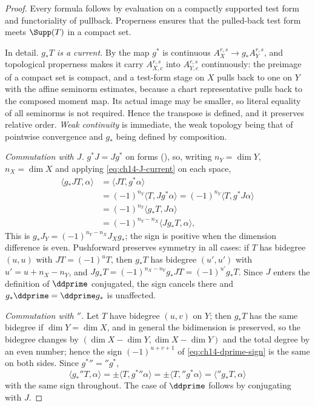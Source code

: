 \begin{proof}
Every formula follows by evaluation on a compactly supported test form and
functoriality of pullback.  Properness ensures that the pulled-back test form
meets $\Supp(T)$ in a compact set.

In detail.  \emph{$g_*T$ is a current.}  By
 the map $g^*$ is continuous
$A_X^{r,s}\to g_*A_Y^{r,s}$, and topological properness makes it carry
$A_{X,c}^{r,s}$ into $A_{Y,c}^{r,s}$ continuously: the preimage of a compact
set is compact, and a test-form stage on $X$ pulls back to one on $Y$ with the
affine seminorm estimates, because a chart representative pulls back
to the composed moment map. Its actual image may be smaller, so literal
equality of all seminorms is not required.  Hence the transpose is defined,
and it preserves relative order.  \emph{Weak continuity} is immediate, the
weak topology being that of pointwise convergence and $g_*$ being defined by
composition.

\emph{Commutation with $J$.}  $g^*J=Jg^*$ on forms
(), so, writing $n_Y=\dim Y$, $n_X=\dim X$ and
applying \eqref{eq:ch14-J-current} on each space,
\[
 \begin{aligned}
 \langle g_*JT,\alpha\rangle
 &=\langle JT,g^*\alpha\rangle\\
 &=(-1)^{n_Y}\langle T,Jg^*\alpha\rangle
  =(-1)^{n_Y}\langle T,g^*J\alpha\rangle\\
 &=(-1)^{n_Y}\langle g_*T,J\alpha\rangle\\
 &=(-1)^{n_Y-n_X}\langle Jg_*T,\alpha\rangle ,
 \end{aligned}
\]
This is $g_*J_Y=(-1)^{n_Y-n_X}J_Xg_*$; the sign is positive when
the dimension difference is even.  Pushforward preserves symmetry in all cases: if $T$ has
bidegree $(u,u)$ with $JT=(-1)^uT$, then $g_*T$ has bidegree $(u',u')$ with
$u'=u+n_X-n_Y$, and
$Jg_*T=(-1)^{n_X-n_Y}g_*JT=(-1)^{u'}g_*T$.  Since $J$ enters the definition
of $\ddprime$ conjugated, the sign cancels there and
$g_*\ddprime=\ddprime g_*$ is unaffected.

\emph{Commutation with $\dprime$.}  Let $T$ have bidegree $(u,v)$ on $Y$;
then $g_*T$ has the same bidegree if $\dim Y=\dim X$, and in general the
bidimension is preserved, so the bidegree changes by
$(\dim X-\dim Y,\dim X-\dim Y)$ and the total degree by an even number;
hence the sign $(-1)^{u+v+1}$ of \eqref{eq:ch14-dprime-sign} is the same on
both sides.  Since $g^*\dprime=\dprime g^*$,
\[
 \langle g_*\dprime T,\alpha\rangle
 =\pm\langle T,g^*\dprime\alpha\rangle
 =\pm\langle T,\dprime g^*\alpha\rangle
 =\langle \dprime g_*T,\alpha\rangle
\]
with the same sign throughout.  The case of $\ddprime$ follows by conjugating
with $J$.


\end{proof}
